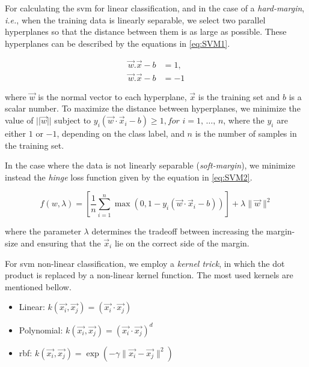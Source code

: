 For calculating the \ac{svm} for linear classification, and in the case of a \textit{hard-margin}, \textit{i.e.}, when the training data is linearly separable, we select two parallel hyperplanes so that the distance between them is as large as possible.
These hyperplanes can be described by the equations in \ref{eq:SVM1}.

\begin{equation}
\label{eq:SVM1}
\begin{split}
\vec{w}.\vec{x}-b&=1, \\
\vec{w}.\vec{x}-b&=-1
\end{split}
\end{equation}

where $\vec{w}$ is the normal vector to each hyperplane, $\vec{x}$ is the training set and $b$ is a scalar number.
To maximize the distance between hyperplanes, we minimize the value of $||\vec{w}||$ subject to ${\displaystyle y_{i}({\vec {w}}\cdot {\vec {x}}_{i}-b)\geq 1,} for$ ${\displaystyle i=1,\,\ldots ,\,n} $, where the $y_{i}$ are either $1$ or $-1$, depending on the class label, and $n$ is the number of samples in the training set.

In the case where the data is not linearly separable (\textit{soft-margin}), we minimize instead the \textit{hinge} loss function given by the equation in \ref{eq:SVM2}.

\begin{equation}
\label{eq:SVM2}
f(w,\lambda)={\displaystyle \left[{\frac {1}{n}}\sum _{i=1}^{n}\max \left(0,1-y_{i}({\vec {w}}\cdot {\vec {x}}_{i}-b)\right)\right]+\lambda \lVert {\vec {w}}\rVert ^{2}}
\end{equation}

where the parameter $\lambda$ determines the tradeoff between increasing the margin-size and ensuring that the ${\vec {x}}_{i}$ lie on the correct side of the margin.

For \ac{svm} non-linear classification, we employ a \textit{kernel trick}, in which the dot product is replaced by a non-linear kernel function. The most used kernels are mentioned bellow.

\begin{itemize}
    \setlength\itemsep{1em}
    \item Linear: ${\displaystyle k({\vec {x_{i}}},{\vec {x_{j}}})=({\vec {x_{i}}}\cdot {\vec {x_{j}}})}$

    \item Polynomial: ${\displaystyle k({\vec {x_{i}}},{\vec {x_{j}}})=({\vec {x_{i}}}\cdot {\vec {x_{j}}})^{d}}$

    \item \ac{rbf}: ${\displaystyle k({\vec {x_{i}}},{\vec {x_{j}}})=\exp(-\gamma \|{\vec {x_{i}}}-{\vec {x_{j}}}\|^{2})}$
\end{itemize}


